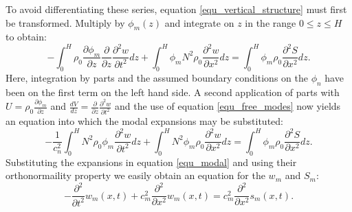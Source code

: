 \documentclass[a4paper,10pt]{article}
\begin{document}
To avoid differentiating these series, equation \ref{equ_vertical_structure} must first be transformed. 
Multiply by $\phi_m(z)$ and integrate on $z$ in the range $0\leq z\leq H$ to obtain:
%
\begin{equation}
- \int_0^H  \rho_0 \frac{\partial \phi_m}{\partial z}  \frac{\partial}{\partial z} \frac{\partial^2 w}{\partial t^2}  dz  + \int_0^H \phi_m  N^2 \rho_0 \frac{\partial^2 w}{\partial x^2} dz  = \int_0^H  \phi_m \rho_0 \frac{\partial^2 S}{\partial x^2} dz.
\end{equation}
%
Here, integration by parts and the assumed boundary conditions on the $\phi_n$ have been on the first term on the left hand side. A second application of parts with
$U= \rho_0 \frac{\partial \phi_m}{\partial z} $ and $\frac{dV}{dz} = \frac{\partial}{\partial z} \frac{\partial^2 w}{\partial t^2} $ and the use of equation \ref{equ_free_modes} 
now yields an equation into which the modal expansions may be substituted:
%
\begin{equation}
- \frac{1}{c_n^2} \int_0^H  N^2 \rho_0 \phi_m \frac{\partial^2 w}{\partial t^2}  dz  +   \int_0^H N^2 \phi_m \rho_0 \frac{\partial^2 w}{\partial x^2} dz  = \int_0^H  \phi_m \rho_0 \frac{\partial^2 S}{\partial x^2} dz.
\end{equation}
%
Substituting the expansions in equation \ref{equ_modal} and using their orthonormaility property we easily obtain an equation for the $w_m$ and $S_m$:
%
\begin{equation}
\label{equ_vertical_structure_2}
-  \frac{\partial^2 }{\partial t^2} w_m(x,t)  + c_m^2   \frac{\partial^2 }{\partial x^2} w_m(x,t)   =  c_m^2 \frac{\partial^2 }{\partial x^2} s_m(x,t).
\end{equation}
%
\end{document}
